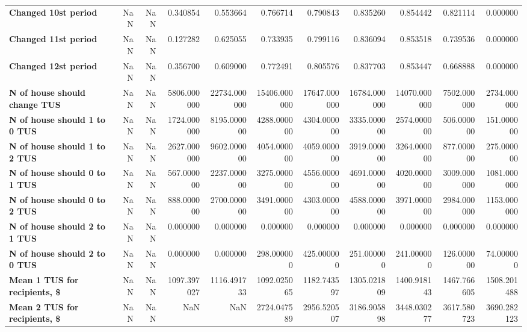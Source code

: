 \begin{longtable}{lrrrrrrrrrr}
\textbf{Changed 10st period               } &   NaN &   NaN &     0.340854 &      0.553664 &      0.766714 &      0.790843 &      0.835260 &      0.854442 &     0.821114 &     0.000000 \\
\textbf{Changed 11st period               } &   NaN &   NaN &     0.127282 &      0.625055 &      0.733935 &      0.799116 &      0.836094 &      0.853518 &     0.739536 &     0.000000 \\
\textbf{Changed 12st period               } &   NaN &   NaN &     0.356700 &      0.609000 &      0.772491 &      0.805576 &      0.837703 &      0.853447 &     0.668888 &     0.000000 \\
\textbf{N of house should change TUS      } &   NaN &   NaN &  5806.000000 &  22734.000000 &  15406.000000 &  17647.000000 &  16784.000000 &  14070.000000 &  7502.000000 &  2734.000000 \\
\textbf{N of house should 1 to 0 TUS      } &   NaN &   NaN &  1724.000000 &   8195.000000 &   4288.000000 &   4304.000000 &   3335.000000 &   2574.000000 &   506.000000 &   151.000000 \\
\textbf{N of house should 1 to 2 TUS      } &   NaN &   NaN &  2627.000000 &   9602.000000 &   4054.000000 &   4059.000000 &   3919.000000 &   3264.000000 &   877.000000 &   275.000000 \\
\textbf{N of house should 0 to 1 TUS      } &   NaN &   NaN &   567.000000 &   2237.000000 &   3275.000000 &   4556.000000 &   4691.000000 &   4020.000000 &  3009.000000 &  1081.000000 \\
\textbf{N of house should 0 to 2 TUS      } &   NaN &   NaN &   888.000000 &   2700.000000 &   3491.000000 &   4303.000000 &   4588.000000 &   3971.000000 &  2984.000000 &  1153.000000 \\
\textbf{N of house should 2 to 1 TUS      } &   NaN &   NaN &     0.000000 &      0.000000 &      0.000000 &      0.000000 &      0.000000 &      0.000000 &     0.000000 &     0.000000 \\
\textbf{N of house should 2 to 0 TUS      } &   NaN &   NaN &     0.000000 &      0.000000 &    298.000000 &    425.000000 &    251.000000 &    241.000000 &   126.000000 &    74.000000 \\
\textbf{Mean 1 TUS for recipients, \$      } &   NaN &   NaN &  1097.397027 &   1116.491733 &   1092.025065 &   1182.743597 &   1305.021809 &   1400.918143 &  1467.766605 &  1508.201488 \\
\textbf{Mean 2 TUS for recipients, \$      } &   NaN &   NaN &          NaN &           NaN &   2724.047589 &   2956.520507 &   3186.905898 &   3448.030277 &  3617.580723 &  3690.282123 \\

\end{longtable}
